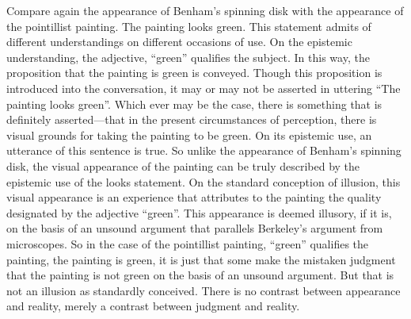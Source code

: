 \documentclass[12pt]{article}
\begin{document}
Compare again the appearance of Benham's spinning disk with the appearance of the pointillist painting. The painting looks green. This statement admits of different understandings on different occasions of use. On the epistemic understanding, the adjective, ``green'' qualifies the subject. In this way, the proposition that the painting is green is conveyed. Though this proposition is introduced into the conversation, it may or may not be asserted in uttering ``The painting looks green''. Which ever may be the case, there is something that is definitely asserted---that in the present circumstances of perception, there is visual grounds for taking the painting to be green. On its epistemic use, an utterance of this sentence is true. So unlike the appearance of Benham's spinning disk, the visual appearance of the painting can be truly described by the epistemic use of the looks statement. On the standard conception of illusion, this visual appearance is an experience that attributes to the painting the quality designated by the adjective ``green''. This appearance is deemed illusory, if it is, on the basis of an unsound argument that parallels Berkeley's argument from microscopes. So in the case of the pointillist painting, ``green'' qualifies the painting, the painting is green, it is just that some make the mistaken judgment that the painting is not green on the basis of an unsound argument. But that is not an illusion as standardly conceived. There is no contrast between appearance and reality, merely a contrast between judgment and reality.

\end{document}
